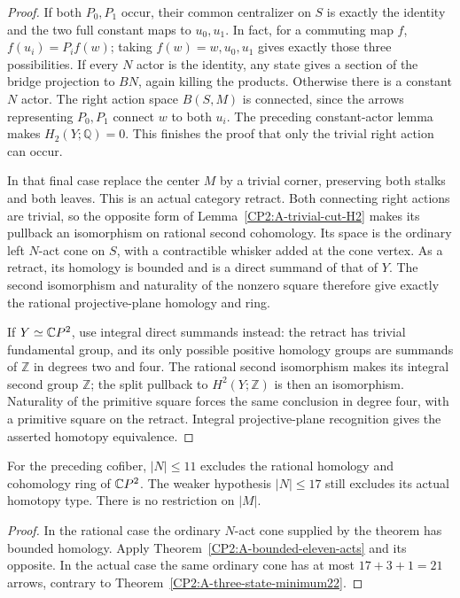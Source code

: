 \begin{proof}
If both $P_0,P_1$ occur, their common centralizer on $S$
is exactly the identity and the two full constant maps
to $u_0,u_1$. In fact, for a commuting map $f$,
$f(u_i)=P_i f(w)$; taking $f(w)=w,u_0,u_1$ gives exactly
those three possibilities. If every $N$ actor is the
identity, any state gives a section of the bridge
projection to $BN$, again killing the products. Otherwise
there is a constant $N$ actor. The right action space
$B(S,M)$ is connected, since the arrows representing
$P_0,P_1$ connect $w$ to both $u_i$. The preceding
constant-actor lemma makes $H_2(Y;\mathbb Q)=0$.
This finishes the proof that only the trivial right
action can occur.

In that final case replace the center $M$ by a trivial
corner, preserving both stalks and both leaves. This is
an actual category retract. Both connecting right actions
are trivial, so the opposite form of
Lemma~\ref{CP2:A-trivial-cut-H2} makes its pullback an
isomorphism on rational second cohomology. Its space is
the ordinary left $N$-act cone on $S$, with a contractible
whisker added at the cone vertex. As a retract, its homology
is bounded and is a direct summand of that of $Y$.
The second isomorphism and naturality of the nonzero square
therefore give exactly the rational projective-plane
homology and ring.

If $Y\simeq\mathbb{C}P^2$, use integral direct summands instead:
the retract has trivial fundamental group, and its only
possible positive homology groups are summands of
$\mathbb Z$ in degrees two and four. The rational second
isomorphism makes its integral second group $\mathbb Z$;
the split pullback to $H^2(Y;\mathbb Z)$ is then an
isomorphism. Naturality of the primitive square forces
the same conclusion in degree four, with a primitive
square on the retract. Integral projective-plane
recognition gives the asserted homotopy equivalence.
\end{proof}

\begin{corollary}
\label{CP2:A-coned-three-leaf-bounds}
For the preceding cofiber, $|N|\leq11$ excludes the
rational homology and cohomology ring of $\mathbb{C}P^2$.
The weaker hypothesis $|N|\leq17$ still excludes its
actual homotopy type. There is no restriction on $|M|$.
\end{corollary}
\begin{proof}
In the rational case the ordinary $N$-act cone supplied
by the theorem has bounded homology. Apply
Theorem~\ref{CP2:A-bounded-eleven-acts} and its opposite.
In the actual case the same ordinary cone has at most
$17+3+1=21$ arrows, contrary to
Theorem~\ref{CP2:A-three-state-minimum22}.
\end{proof}
